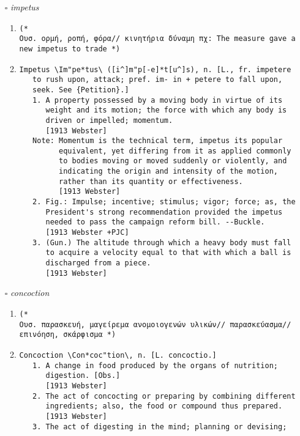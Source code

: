 \documentclass{article}
\begin{document}
\begin{itemize}
\begin{enumerate}
{\begin{lstlisting}
\end{lstlisting}}
\end{enumerate}
\item[$\square$] \emph{ impetus }
\begin{enumerate}
\item{
\begin{lstlisting}
(* 
Ουσ. ορμή, ροπή, φόρα// κινητήρια δύναμη πχ: Τhe measure gave a new impetus to trade *)
\end{lstlisting}}
\item{
\begin{lstlisting}
Impetus \Im"pe*tus\ ([i^]m"p[-e]*t[u^]s), n. [L., fr. impetere
   to rush upon, attack; pref. im- in + petere to fall upon,
   seek. See {Petition}.]
   1. A property possessed by a moving body in virtue of its
      weight and its motion; the force with which any body is
      driven or impelled; momentum.
      [1913 Webster]
   Note: Momentum is the technical term, impetus its popular
         equivalent, yet differing from it as applied commonly
         to bodies moving or moved suddenly or violently, and
         indicating the origin and intensity of the motion,
         rather than its quantity or effectiveness.
         [1913 Webster]
   2. Fig.: Impulse; incentive; stimulus; vigor; force; as, the
      President's strong recommendation provided the impetus
      needed to pass the campaign reform bill. --Buckle.
      [1913 Webster +PJC]
   3. (Gun.) The altitude through which a heavy body must fall
      to acquire a velocity equal to that with which a ball is
      discharged from a piece.
      [1913 Webster]
\end{lstlisting}}
\end{enumerate}
\item[$\square$] \emph{ concoction }
\begin{enumerate}
\item{
\begin{lstlisting}
(* 
Ουσ. παρασκευή, μαγείρεμα ανομοιογενών υλικών// παρασκεύασμα// επινόηση, σκάρφισμα *)
\end{lstlisting}}
\item{
\begin{lstlisting}
Concoction \Con*coc"tion\, n. [L. concoctio.]
   1. A change in food produced by the organs of nutrition;
      digestion. [Obs.]
      [1913 Webster]
   2. The act of concocting or preparing by combining different
      ingredients; also, the food or compound thus prepared.
      [1913 Webster]
   3. The act of digesting in the mind; planning or devising;

\end{lstlisting}}
\end{enumerate}
\end{itemize}
\end{document}
